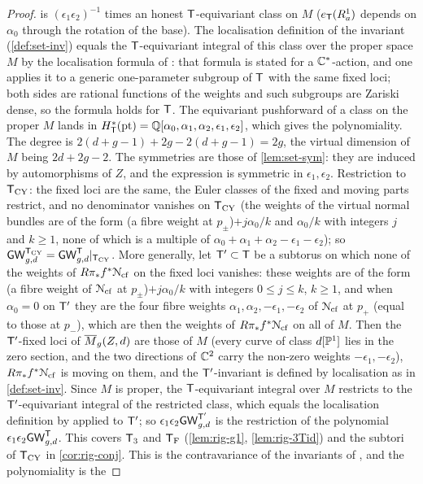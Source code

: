 \begin{proof}
is $(\epsilon_1\epsilon_2)^{-1}$ times an honest $\mathsf{T}$-equivariant class on $M$ ($e_{\mathsf{T}}(R^1_a)$ depends on $\alpha_0$ through the rotation of the base). The localisation definition of the invariant (\cref{def:set-inv}) equals the $\mathsf{T}$-equivariant integral of this class over the proper space $M$ by the localisation formula of \cite{GP99}: that formula is stated for a $\mathbb{C}^*$-action, and one applies it to a generic one-parameter subgroup of $\mathsf{T}$ with the same fixed loci; both sides are rational functions of the weights and such subgroups are Zariski dense, so the formula holds for $\mathsf{T}$. The equivariant pushforward of a class on the proper $M$ lands in $H^*_{\mathsf{T}}(\mathrm{pt})=\mathbb{Q}[\alpha_0,\alpha_1,\alpha_2,\epsilon_1,\epsilon_2]$, which gives the polynomiality. The degree is $2(d+g-1)+2g-2(d+g-1)=2g$, the virtual dimension of $M$ being $2d+2g-2$. The symmetries are those of \cref{lem:set-sym}: they are induced by automorphisms of $Z$, and the expression is symmetric in $\epsilon_1,\epsilon_2$. Restriction to $\mathsf{T}_{\mathrm{CY}}$: the fixed loci are the same, the Euler classes of the fixed and moving parts restrict, and no denominator vanishes on $\mathsf{T}_{\mathrm{CY}}$ (the weights of the virtual normal bundles are of the form (a fibre weight at $p_\pm$)$+j\alpha_0/k$ and $\alpha_0/k$ with integers $j$ and $k\geq 1$, none of which is a multiple of $\alpha_0+\alpha_1+\alpha_2-\epsilon_1-\epsilon_2$); so $\mathsf{GW}^{\mathsf{T}_{\mathrm{CY}}}_{g,d}=\mathsf{GW}^{\mathsf{T}}_{g,d}|_{\mathsf{T}_{\mathrm{CY}}}$. More generally, let $\mathsf{T}'\subset\mathsf{T}$ be a subtorus on which none of the weights of $R\pi_*f^*\mathcal{N}_{\mathrm{cf}}$ on the fixed loci vanishes: these weights are of the form (a fibre weight of $\mathcal{N}_{\mathrm{cf}}$ at $p_\pm$)$+j\alpha_0/k$ with integers $0\leq j\leq k$, $k\geq 1$, and when $\alpha_0=0$ on $\mathsf{T}'$ they are the four fibre weights $\alpha_1,\alpha_2,-\epsilon_1,-\epsilon_2$ of $\mathcal{N}_{\mathrm{cf}}$ at $p_+$ (equal to those at $p_-$), which are then the weights of $R\pi_*f^*\mathcal{N}_{\mathrm{cf}}$ on all of $M$. Then the $\mathsf{T}'$-fixed loci of $\overline{M}_g(Z,d)$ are those of $M$ (every curve of class $d[\mathbb{P}^1]$ lies in the zero section, and the two directions of $\mathbb{C}^2$ carry the non-zero weights $-\epsilon_1,-\epsilon_2$), $R\pi_*f^*\mathcal{N}_{\mathrm{cf}}$ is moving on them, and the $\mathsf{T}'$-invariant is defined by localisation as in \cref{def:set-inv}. Since $M$ is proper, the $\mathsf{T}$-equivariant integral over $M$ restricts to the $\mathsf{T}'$-equivariant integral of the restricted class, which equals the localisation definition by \cite{GP99} applied to $\mathsf{T}'$; so $\epsilon_1\epsilon_2\mathsf{GW}^{\mathsf{T}'}_{g,d}$ is the restriction of the polynomial $\epsilon_1\epsilon_2\mathsf{GW}^{\mathsf{T}}_{g,d}$. This covers $\mathsf{T}_{3}$ and $\mathsf{T}_{\mathrm{F}}$ (\cref{lem:rig-g1}, \cref{lem:rig-3Tid}) and the subtori of $\mathsf{T}_{\mathrm{CY}}$ in \cref{cor:rig-conj}.  This is the contravariance of the invariants of \cite{BS}, and the polynomiality is the 
\end{proof}
